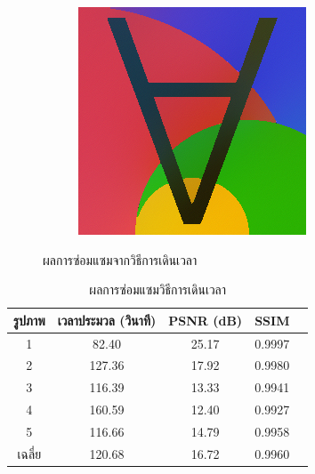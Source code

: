 \documentclass[hidelinks, a4paper,12pt]{article}
\numberwithin{equation}{section}							%
\numberwithin{equation}{section}
\begin{document}
{\begin{figure}[H]
\begin{subfigure}{0.4\linewidth}
			\includegraphics[width=0.8\linewidth]{images/result_ex1/timemarch05.png}			
		\end{subfigure}
		\caption{ผลการซ่อมแซมจากวิธีการเดินเวลา}
		\label{result:image-timemarching}
	\end{figure}
\begin{table}[H]
	\centering
	\begin{tabular}[ht]{|c|c|c|c|c|}
		\hline
		รูปภาพ &เวลาประมวล  (วินาที) & PSNR (dB) & SSIM \\
		\hline
		1 & 82.40 & 25.17 & 0.9997 \\ 
		2 & 127.36 & 17.92 & 0.9980 \\
		3 &  116.39 & 13.33 & 0.9941 \\
		4 & 160.59  &12.40  & 0.9927 \\
		5 & 116.66  & 14.79  & 0.9958 \\
		\hline
		เฉลี่ย & 120.68  & 16.72  & 0.9960 \\
		\hline
	\end{tabular}
	\caption{ผลการซ่อมแซมวิธีการเดินเวลา}
	\label{result:table-timemarching}
\end{table}	
\begin{figure}[H]
	\centering
	\begin{subfigure}{0.4\linewidth}
		\centering

\end{subfigure}
\end{figure}}
\end{document}
